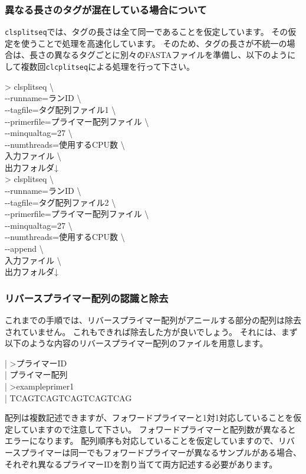 \documentclass[titlepage,10pt,a4paper]{jsbook}
\newenvironment{content}{\begin{shaded}\vspace{-1em}\raggedright\ttfamily\footnotesize\setlength{\baselineskip}{1.4em}}{\end{shaded}\vspace{-1em}}
\newenvironment{cmd}{\begin{oframed}\raggedright\ttfamily\footnotesize\setlength{\baselineskip}{1.4em}}{\end{oframed}\vspace{-1em}}
\begin{document}
\subsubsection{異なる長さのタグが混在している場合について}
\texttt{clsplitseq}では、タグの長さは全て同一であることを仮定しています。
その仮定を使うことで処理を高速化しています。
そのため、タグの長さが不統一の場合は、長さの異なるタグごとに別々のFASTAファイルを準備し、以下のようにして複数回\texttt{clcplitseq}による処理を行って下さい。
\begin{cmd}
{\textgreater} clsplitseq {\textbackslash}\\
{-}{-}runname=ランID {\textbackslash}\\
{-}{-}tagfile=タグ配列ファイル1 {\textbackslash}\\
{-}{-}primerfile=プライマー配列ファイル {\textbackslash}\\
{-}{-}minqualtag=27 {\textbackslash}\\
{-}{-}numthreads=使用するCPU数 {\textbackslash}\\
入力ファイル {\textbackslash}\\
出力フォルダ↓\\
{\textgreater} clsplitseq {\textbackslash}\\
{-}{-}runname=ランID {\textbackslash}\\
{-}{-}tagfile=タグ配列ファイル2 {\textbackslash}\\
{-}{-}primerfile=プライマー配列ファイル {\textbackslash}\\
{-}{-}minqualtag=27 {\textbackslash}\\
{-}{-}numthreads=使用するCPU数 {\textbackslash}\\
{-}{-}append {\textbackslash}\\
入力ファイル {\textbackslash}\\
出力フォルダ↓
\end{cmd}

\subsubsection{リバースプライマー配列の認識と除去}
これまでの手順では、リバースプライマー配列がアニールする部分の配列は除去されていません。
これもできれば除去した方が良いでしょう。
それには、まず以下のような内容のリバースプライマー配列のファイルを用意します。
\begin{content}
| {\textgreater}プライマーID\\
| プライマー配列\\
| {\textgreater}exampleprimer1\\
| TCAGTCAGTCAGTCAGTCAG
\end{content}
配列は複数記述できますが、フォワードプライマーと1対1対応していることを仮定していますので注意して下さい。
フォワードプライマーと配列数が異なるとエラーになります。
配列順序も対応していることを仮定していますので、リバースプライマーは同一でもフォワードプライマーが異なるサンプルがある場合、それぞれ異なるプライマーIDを割り当てて両方記述する必要があります。
\end{document}
